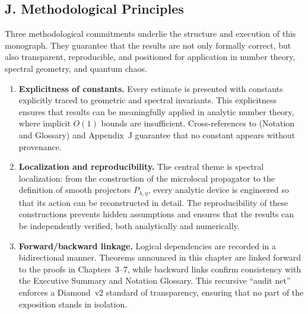 
\subsection*{J. Methodological Principles}

Three methodological commitments underlie the structure and execution of this monograph.  
They guarantee that the results are not only formally correct, but also transparent,
reproducible, and positioned for application in number theory, spectral geometry,
and quantum chaos.

\begin{enumerate}[label=\arabic*.]
  \item \textbf{Explicitness of constants.}  
  Every estimate is presented with constants explicitly traced to geometric and spectral invariants.  
  This explicitness ensures that results can be meaningfully applied in analytic number theory,
  where implicit $O(1)$ bounds are insufficient.  
  Cross-references to  (Notation and Glossary) and Appendix~J 
  guarantee that no constant appears without provenance.

  \item \textbf{Localization and reproducibility.}  
  The central theme is spectral localization: from the construction of the microlocal propagator 
  to the definition of smooth projectors $P_{\lambda,\eta}$, every analytic device is engineered 
  so that its action can be reconstructed in detail.  
  The reproducibility of these constructions prevents hidden assumptions and ensures
  that the results can be independently verified, both analytically and numerically.

  \item \textbf{Forward/backward linkage.}  
  Logical dependencies are recorded in a bidirectional manner.  
  Theorems announced in this chapter are linked forward to the proofs in Chapters~3–7,  
  while backward links confirm consistency with the Executive Summary and Notation Glossary.  
  This recursive “audit net” enforces a Diamond~v2 standard of transparency,  
  ensuring that no part of the exposition stands in isolation.
\end{enumerate}

